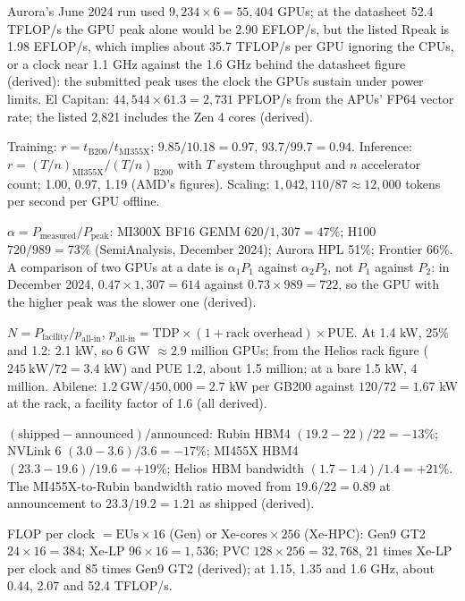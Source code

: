 \documentclass[11pt,letterpaper]{article}
\begin{document}
\begin{description}[leftmargin=0pt,labelindent=0pt,itemsep=6pt,font=\normalfont\bfseries\sffamily]
\item[Peak from counts.] Aurora's June 2024 run used $9{,}234\times 6 = 55{,}404$ GPUs; at the datasheet 52.4 TFLOP/s the GPU peak alone would be 2.90 EFLOP/s, but the listed Rpeak is 1.98 EFLOP/s, which implies about 35.7 TFLOP/s per GPU ignoring the CPUs, or a clock near 1.1 GHz against the 1.6 GHz behind the datasheet figure (derived): the submitted peak uses the clock the GPUs sustain under power limits. El Capitan: $44{,}544\times 61.3 = 2{,}731$ PFLOP/s from the APUs' FP64 vector rate; the listed 2{,}821 includes the Zen 4 cores (derived).
\item[MLPerf ratios.] Training: $r = t_{\text{B200}}/t_{\text{MI355X}}$; $9.85/10.18 = 0.97$, $93.7/99.7 = 0.94$. Inference: $r = (T/n)_{\text{MI355X}}/(T/n)_{\text{B200}}$ with $T$ system throughput and $n$ accelerator count; 1.00, 0.97, 1.19 (AMD's figures). Scaling: $1{,}042{,}110/87 \approx 12{,}000$ tokens per second per GPU offline.
\item[Achieved fraction.] $\alpha = P_{\text{measured}}/P_{\text{peak}}$: MI300X BF16 GEMM $620/1{,}307 = 47\%$; H100 $720/989 = 73\%$ (SemiAnalysis, December 2024); Aurora HPL 51\%; Frontier 66\%. A comparison of two GPUs at a date is $\alpha_1 P_1$ against $\alpha_2 P_2$, not $P_1$ against $P_2$: in December 2024, $0.47\times 1{,}307 = 614$ against $0.73\times 989 = 722$, so the GPU with the higher peak was the slower one (derived).
\item[Gigawatts to GPUs.] $N = P_{\text{facility}}/p_{\text{all-in}}$, $p_{\text{all-in}} = \text{TDP}\times(1 + \text{rack overhead})\times\text{PUE}$. At 1.4 kW, 25\% and 1.2: 2.1 kW, so 6 GW $\approx 2.9$ million GPUs; from the Helios rack figure ($245\ \mathrm{kW}/72 = 3.4$ kW) and PUE 1.2, about 1.5 million; at a bare 1.5 kW, 4 million. Abilene: $1.2\ \mathrm{GW}/450{,}000 = 2.7$ kW per GB200 against $120/72 = 1.67$ kW at the rack, a facility factor of 1.6 (all derived).
\item[Announced versus shipped.] $(\text{shipped} - \text{announced})/\text{announced}$: Rubin HBM4 $(19.2 - 22)/22 = -13\%$; NVLink 6 $(3.0 - 3.6)/3.6 = -17\%$; MI455X HBM4 $(23.3 - 19.6)/19.6 = +19\%$; Helios HBM bandwidth $(1.7 - 1.4)/1.4 = +21\%$. The MI455X-to-Rubin bandwidth ratio moved from $19.6/22 = 0.89$ at announcement to $23.3/19.2 = 1.21$ as shipped (derived).
\item[Gen to Xe scaling.] FLOP per clock $= \text{EUs}\times 16$ (Gen) or $\text{Xe-cores}\times 256$ (Xe-HPC): Gen9 GT2 $24\times 16 = 384$; Xe-LP $96\times 16 = 1{,}536$; PVC $128\times 256 = 32{,}768$, 21 times Xe-LP per clock and 85 times Gen9 GT2 (derived); at 1.15, 1.35 and 1.6 GHz, about 0.44, 2.07 and 52.4 TFLOP/s.
\end{description}
\end{document}
